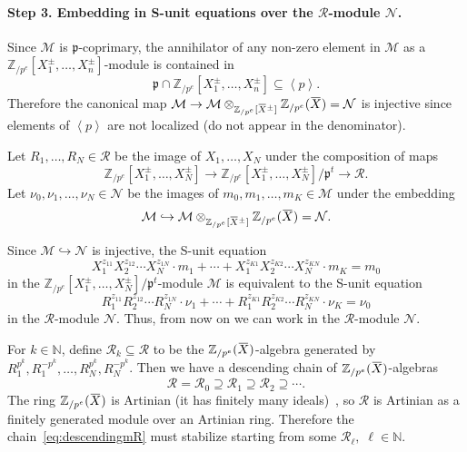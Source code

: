 \documentclass[letterpaper, 11pt, thm-restate]{article}
\numberwithin{equation}{section}
\newcommand{\N}{\mathbb{N}}
\newcommand{\Zpe}{\mathbb{Z}_{/p^e}}
\newcommand{\mM}{\mathcal{M}}
\newcommand{\mN}{\mathcal{N}}
\newcommand{\mR}{\mathcal{R}}
\newcommand{\gen}[1]{\left\langle {#1} \right\rangle}
\newcommand{\oX}{\mkern 1.5mu\overline{\mkern-1.5mu X \mkern-1.5mu}\mkern 1.5mu}
\newcommand{\frp}{\mathfrak{p}}
\theoremstyle{definition}
\theoremstyle{definition}
\theoremstyle{definition}
\begin{document}
\paragraph{Step 3. Embedding in S-unit equations over the $\mR$-module $\mN$.}

Since $\mM$ is $\frp$-coprimary, the annihilator of any non-zero element in $\mM$ as a $\Zpe[X_1^{\pm}, \ldots, X_n^{\pm}]$-module is contained in 
\[
\frp \cap \Zpe[X_1^{\pm}, \ldots, X_n^{\pm}] \subseteq \gen{p}.
\]
Therefore the canonical map $\mM \rightarrow \mM \otimes_{\Zpe[\oX^{\pm}]} \Zpe(\oX) = \mN$ is injective since elements of $\gen{p}$ are not localized (do not appear in the denominator).

Let $R_1, \ldots, R_N \in \mR$ be the image of $X_1, \ldots, X_N$ under the composition of maps 
\[
\Zpe[X_1^{\pm}, \ldots, X_N^{\pm}] \rightarrow \Zpe[X_1^{\pm}, \ldots, X_N^{\pm}]/\frp^t \rightarrow \mR.
\]
Let $\nu_0, \nu_1, \ldots, \nu_N \in \mN$ be the images of $m_0, m_1, \ldots, m_K \in \mM$ under the embedding 
\[
\mM \hookrightarrow \mM \otimes_{\Zpe[\oX^{\pm}]} \Zpe(\oX) = \mN.
\]

Since $\mM \hookrightarrow \mN$ is injective, the S-unit equation
    \[
        X_1^{z_{11}} X_2^{z_{12}} \cdots X_N^{z_{1N}} \cdot m_1 + \cdots + X_1^{z_{K1}} X_2^{z_{K2}} \cdots X_N^{z_{KN}} \cdot m_K = m_0
    \]
in the $\Zpe[X_1^{\pm}, \ldots, X_N^{\pm}]/\frp^t$-module $\mM$ is equivalent to the S-unit equation
\[
    R_1^{z_{11}} R_2^{z_{12}} \cdots R_N^{z_{1N}} \cdot \nu_1 + \cdots + R_1^{z_{K1}} R_2^{z_{K2}} \cdots R_N^{z_{KN}} \cdot \nu_K = \nu_0
\]
in the $\mR$-module $\mN$.
Thus, from now on we can work in the $\mR$-module $\mN$.

For $k \in \N$, define $\mR_{k} \subseteq \mR$ to be the $\Zpe(\oX)$-algebra generated by $R_1^{p^{k}}, R_1^{-p^{k}}, \ldots, R_N^{p^{k}}, R_N^{-p^{k}}$.
Then we have a descending chain of $\Zpe(\oX)$-algebras
\begin{equation}\label{eq:descendingmR}
\mR = \mR_0 \supseteq \mR_1 \supseteq \mR_2 \supseteq \cdots.
\end{equation}
The ring $\Zpe(\oX)$ is Artinian (it has finitely many ideals)~\cite[Theorem~2.13]{eisenbud2013commutative}, so $\mR$ is Artinian as a finitely generated module over an Artinian ring. Therefore the chain~\eqref{eq:descendingmR} must stabilize starting from some $\mR_{\ell},\; \ell \in \N$.
\end{document}
